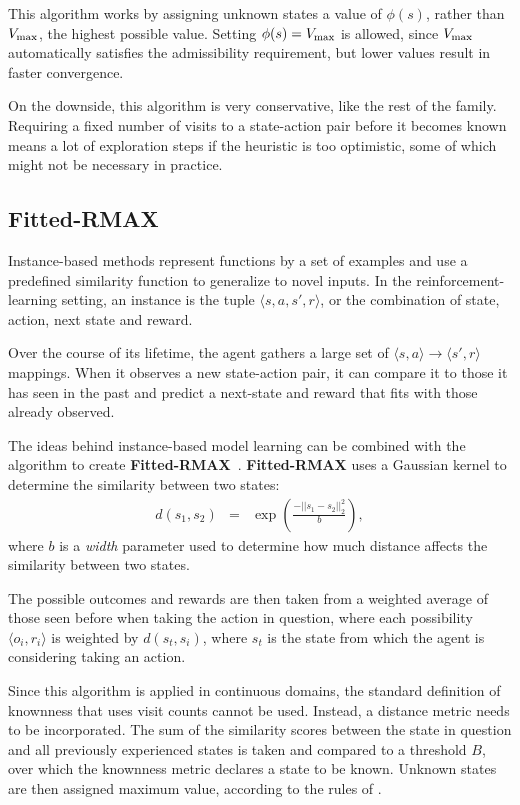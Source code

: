This algorithm works by assigning unknown states a value of $\phi(s)$, rather than $V_{\rm max}$, the highest possible value. Setting $\phi(s)=V_{\rm max}$ is allowed, since $V_{\rm max}$ automatically satisfies the admissibility requirement, but lower values result in faster convergence.

On the downside, this algorithm is very conservative, like the rest of the  family. Requiring a fixed number of visits to a state-action pair before it becomes known means a lot of exploration steps if the heuristic is too optimistic, some of which might not be necessary in practice.


\subsection{Fitted-RMAX}

Instance-based methods represent functions by a set of examples and use a predefined similarity function to generalize to novel inputs. In the reinforcement-learning setting, an instance is the tuple $\langle s, a, s', r \rangle$, or the combination of state, action, next state and reward.

Over the course of its lifetime, the agent gathers a large set of $\langle s, a\rangle \rightarrow \langle s', r \rangle$ mappings. When it observes a new state-action pair, it can compare it to those it has seen in the past and predict a next-state and reward that fits with those already observed.

The ideas behind instance-based model learning can be combined with the  algorithm to create {\bf Fitted-RMAX}~\cite{jong07}. {\bf Fitted-RMAX} uses a Gaussian kernel to determine the similarity between two states:
\begin{eqnarray}
d(s_1,s_2)&=&\exp\left(\frac{-||s_1 - s_2||^2_2}{b}\right),
\end{eqnarray}
where $b$ is a \emph{width} parameter used to determine how much distance affects the similarity between two states.

The possible outcomes and rewards are then taken from a weighted average of those seen before when taking the action in question, where each possibility $\langle o_i, r_i \rangle$ is weighted by $d(s_t, s_i)$, where $s_t$ is the state from which the agent is considering taking an action.

Since this algorithm is applied in continuous domains, the standard definition of knownness that uses visit counts cannot be used.  Instead, a distance metric needs to be incorporated. The sum of the similarity scores between the state in question and all previously experienced states is taken and compared to a threshold $B$, over which the knownness metric declares a state to be known. Unknown states are then assigned maximum value, according to the rules of .

